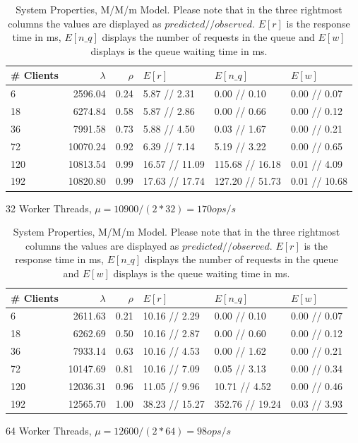 \documentclass[11pt,a4paper]{article}
\begin{document}
\begin{table}
    \begin{subtable}{1.0\linewidth}\centering
        \begin{tabular}{lrrlll}
        \hline
        \# Clients &  $\lambda$ &  $\rho$ &         $E[r]$ &        $E[n\_q]$ &        $E[w]$ \\
        \hline
          6 &    2596.04 &    0.24 &    5.87 // 2.31 &     0.00 // 0.10 &   0.00 // 0.07 \\
         18 &    6274.84 &    0.58 &    5.87 // 2.86 &     0.00 // 0.66 &   0.00 // 0.12 \\
         36 &    7991.58 &    0.73 &    5.88 // 4.50 &     0.03 // 1.67 &   0.00 // 0.21 \\
         72 &   10070.24 &    0.92 &    6.39 // 7.14 &     5.19 // 3.22 &   0.00 // 0.65 \\
        120 &   10813.54 &    0.99 &  16.57 // 11.09 &  115.68 // 16.18 &   0.01 // 4.09 \\
        192 &   10820.80 &    0.99 &  17.63 // 17.74 &  127.20 // 51.73 &  0.01 // 10.68 \\
        \hline
        \end{tabular}
        \caption{32 Worker Threads, $\mu = 10900 / (2*32) = 170 ops/s$}
    \end{subtable}
    
    \begin{subtable}{1.0\linewidth}\centering
        \begin{tabular}{lrrlll}
        \hline
        \# Clients &  $\lambda$ &  $\rho$ &         $E[r]$ &        $E[n\_q]$ &       $E[w]$ \\
        \hline
          6 &    2611.63 &    0.21 &   10.16 // 2.29 &     0.00 // 0.10 &  0.00 // 0.07 \\
         18 &    6262.69 &    0.50 &   10.16 // 2.87 &     0.00 // 0.60 &  0.00 // 0.12 \\
         36 &    7933.14 &    0.63 &   10.16 // 4.53 &     0.00 // 1.62 &  0.00 // 0.21 \\
         72 &   10147.69 &    0.81 &   10.16 // 7.09 &     0.05 // 3.13 &  0.00 // 0.34 \\
        120 &   12036.31 &    0.96 &   11.05 // 9.96 &    10.71 // 4.52 &  0.00 // 0.46 \\
        192 &   12565.70 &    1.00 &  38.23 // 15.27 &  352.76 // 19.24 &  0.03 // 3.93 \\
        \hline
        \end{tabular}
        \caption{64 Worker Threads, $\mu = 12600 / (2*64) = 98 ops/s$}
    \end{subtable}

    \caption{System Properties, M/M/m Model. Please note that in the three rightmost columns the values are displayed as $predicted  //  observed$. $E[r]$ is the response time in ms,  $E[n\_q]$ displays the number of requests in the queue and $E[w]$ displays is the queue waiting time in ms.  }
    \label{MMm}
\end{table}
\end{document}
